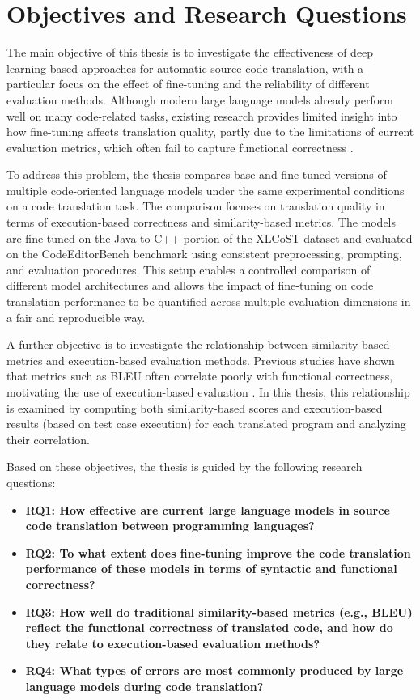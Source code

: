 \section{Objectives and Research Questions}

The main objective of this thesis is to investigate the effectiveness of deep
learning-based approaches for automatic source code translation, with a
particular focus on the effect of fine-tuning and the reliability of different
evaluation methods. Although modern large language models already perform well
on many code-related tasks, existing research provides limited
insight into how fine-tuning affects translation quality, partly
due to the limitations of current evaluation metrics, which often
fail to capture functional correctness \cite{codescore2023, tran2019ruby}.


To address this problem, the thesis compares base and fine-tuned versions of
multiple code-oriented language models under the same experimental conditions on
a code translation task. The comparison focuses on translation quality in terms
of execution-based correctness and similarity-based metrics. The models are
fine-tuned on the Java-to-C++ portion of the XLCoST dataset \cite{xlcost} and
evaluated on the CodeEditorBench benchmark \cite{codeeditorbench} using
consistent preprocessing, prompting, and evaluation procedures. This setup
enables a controlled comparison of different model architectures and allows the
impact of fine-tuning on code translation performance to be quantified across
multiple evaluation dimensions in a fair and reproducible way.

A further objective is to investigate the relationship between similarity-based
metrics and execution-based evaluation methods. Previous studies have shown that
metrics such as BLEU often correlate poorly with functional correctness,
motivating the use of execution-based evaluation \cite{evaluation_limitations,
huang2022exeds}.  In this thesis, this relationship is examined by computing both
similarity-based scores and execution-based results (based on test case
execution) for each translated program and analyzing their correlation.

Based on these objectives, the thesis is guided by the following research
questions:


\begin{itemize}
    \item \textbf{RQ1: How effective are current large language models in source code translation between programming languages?}

    \item \textbf{RQ2: To what extent does fine-tuning improve the code translation performance of these models in terms of syntactic and functional correctness?}

    \item \textbf{RQ3: How well do traditional similarity-based metrics (e.g., BLEU) reflect the functional correctness of translated code, and how do they relate to execution-based evaluation methods?}

    \item \textbf{RQ4: What types of errors are most commonly produced by large language models during code translation?}
\end{itemize}
